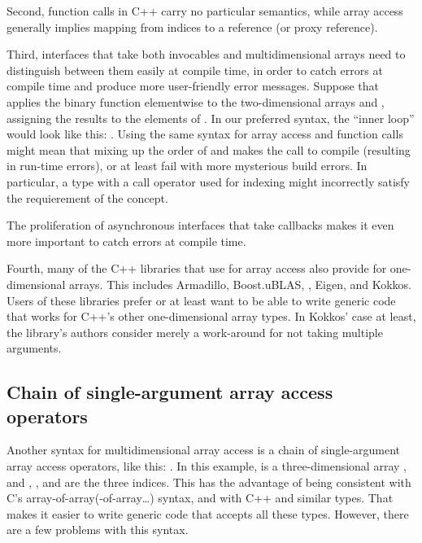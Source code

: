 \documentclass{wg21}
\begin{document}
Second, function calls in C++ carry no particular semantics, while array access generally implies mapping from indices to a reference (or proxy reference).

Third, interfaces that take both invocables and multidimensional arrays need to distinguish between them easily at compile time, in order to catch errors at compile time and produce more user-friendly error messages.  Suppose that  applies the binary function  elementwise to the two-dimensional arrays  and , assigning the results to the elements of .  In our preferred syntax, the ``inner loop'' would look like this: .  Using the same syntax for array access and function calls might mean that mixing up the order of  and  makes the call to  compile (resulting in run-time errors), or at least fail with more mysterious build errors.
In particular, a type with a call operator used for indexing might incorrectly satisfy the requierement of the  concept.

The proliferation of asynchronous interfaces that take callbacks makes it even more important to catch errors at compile time. 

Fourth, many of the C++ libraries that use  for array access also provide  for one-dimensional arrays.  This includes Armadillo, Boost.uBLAS, , Eigen, and Kokkos.  Users of these libraries prefer  or at least want to be able to write generic code that works for C++'s other one-dimensional array types.  In Kokkos' case at least, the library's authors consider  merely a work-around for  not taking multiple arguments.

\subsection{Chain of single-argument array access operators}

Another syntax for multidimensional array access is a chain of single-argument array access operators, like this: .  In this example,  is a three-dimensional array , and , , and  are the three indices.  This has the advantage of being consistent with C's array-of-array(-of-array\ldots) syntax, and with C++  and similar types.  That makes it easier to write generic code that accepts all these types.  However, there are a few problems with this syntax.
\end{document}
